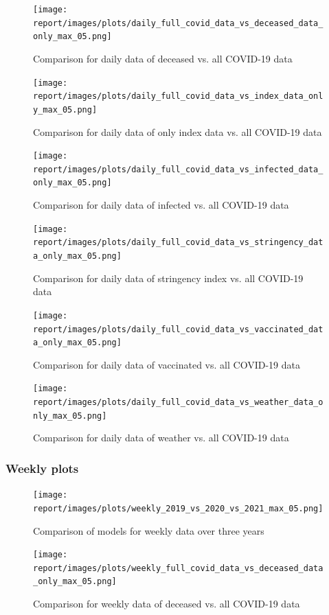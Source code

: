 \begin{figure}[H]
    \texttt{[image: report/images/plots/daily\_full\_covid\_data\_vs\_deceased\_data\_only\_max\_05.png]}
    \caption{Comparison for daily data of deceased vs. all COVID-19 data}
\end{figure}

\begin{figure}[H]
    \texttt{[image: report/images/plots/daily\_full\_covid\_data\_vs\_index\_data\_only\_max\_05.png]}
    \caption{Comparison for daily data of only index data vs. all COVID-19 data}
\end{figure}

\begin{figure}[H]
    \texttt{[image: report/images/plots/daily\_full\_covid\_data\_vs\_infected\_data\_only\_max\_05.png]}
    \caption{Comparison for daily data of infected vs. all COVID-19 data}
\end{figure}

\begin{figure}[H]
    \texttt{[image: report/images/plots/daily\_full\_covid\_data\_vs\_stringency\_data\_only\_max\_05.png]}
    \caption{Comparison for daily data of stringency index vs. all COVID-19 data}
\end{figure}

\begin{figure}[H]
    \texttt{[image: report/images/plots/daily\_full\_covid\_data\_vs\_vaccinated\_data\_only\_max\_05.png]}
    \caption{Comparison for daily data of vaccinated vs. all COVID-19 data}
\end{figure}

\begin{figure}[H]
    \texttt{[image: report/images/plots/daily\_full\_covid\_data\_vs\_weather\_data\_only\_max\_05.png]}
    \caption{Comparison for daily data of weather vs. all COVID-19 data}
\end{figure}

\pagebreak

\subsubsection{Weekly plots}

\begin{figure}[H]
    \texttt{[image: report/images/plots/weekly\_2019\_vs\_2020\_vs\_2021\_max\_05.png]}
    \caption{Comparison of models for weekly data over three years}
\end{figure}

\begin{figure}[H]
    \texttt{[image: report/images/plots/weekly\_full\_covid\_data\_vs\_deceased\_data\_only\_max\_05.png]}
    \caption{Comparison for weekly data of deceased vs. all COVID-19 data}
\end{figure}

